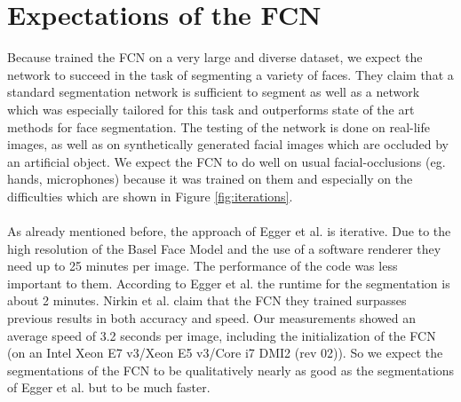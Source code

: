 \section{Expectations of the FCN}
Because \cite{nirkin2018_faceswap} trained the FCN on a very large and diverse dataset, we expect the network to succeed in the task of segmenting a variety of faces. They claim that a standard segmentation network is sufficient to segment as well as a network which was especially tailored for this task and outperforms state of the art methods for face segmentation. The testing of the network is done on real-life images, as well as on synthetically generated facial images which are occluded by an artificial object. We expect the FCN to do well on usual facial-occlusions (eg. hands, microphones) because it was trained on them and especially on the difficulties which are shown in Figure \ref{fig:iterations}.\\
\\
As already mentioned before, the approach of Egger et al. is iterative. Due to the high resolution of the Basel Face Model and the use of a software renderer they need up to 25 minutes per image. The performance of the code was less important to them.  According to Egger et al. the runtime for the segmentation is about 2 minutes. Nirkin et al. claim that the FCN they trained surpasses previous results in both accuracy and speed. Our measurements showed an average speed of 3.2 seconds per image, including the initialization of the FCN (on an Intel Xeon E7 v3/Xeon E5 v3/Core i7 DMI2 (rev 02)). So we expect the segmentations of the FCN to be qualitatively nearly as good as the segmentations of Egger et al. but to be much faster.